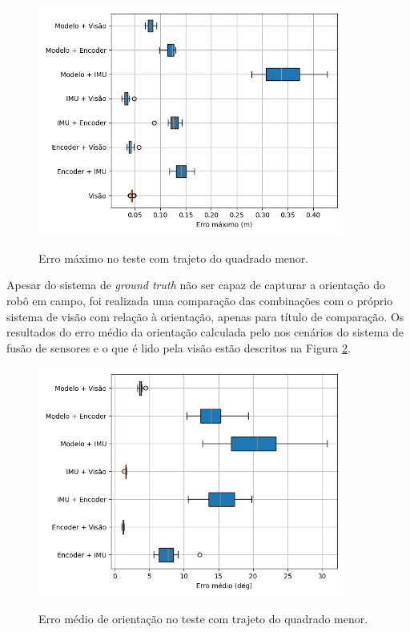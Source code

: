\documentclass[acronym, symbols, table]{fei}
\begin{document}
	\begin{figure}[!htb]
		\centering
		\caption{Erro máximo no teste com trajeto do quadrado menor.}
		\includegraphics[width=0.9\textwidth]{../Dados/Graficos-Resultados/erro_maximo_distancia_quadrado_menor.png}
		\label{fig:erro_maximo_distancia_quad_menor}
	\end{figure}

	Apesar do sistema de \textit{ground truth} não ser capaz de capturar a orientação do robô em campo, foi realizada uma comparação das combinações com o próprio sistema de visão com relação à orientação, apenas para título de comparação. Os resultados do erro médio da orientação calculada pelo nos cenários do sistema de fusão de sensores e o que é lido pela visão estão descritos na Figura \ref{fig:erro_medio_orientacao_quad_menor}. 

	\begin{figure}[!htb]
		\centering
		\caption{Erro médio de orientação no teste com trajeto do quadrado menor.}
		\includegraphics[width=0.9\textwidth]{../Dados/Graficos-Resultados/erro_medio_orientacao_quadrado_menor.png}
		\label{fig:erro_medio_orientacao_quad_menor}
	\end{figure}
\end{document}
